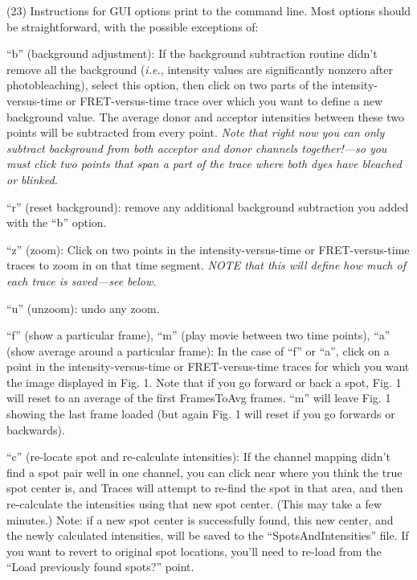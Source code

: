 \documentclass[11pt]{article}
\begin{document}
\noindent (23) Instructions for GUI options print to the command line. Most options should be straightforward, with the possible exceptions of:

``b'' (background adjustment): If the background subtraction routine didn't remove all the background ({\it i.e.}, intensity values are significantly nonzero after photobleaching), select this option, then click on two parts of the intensity-versus-time or FRET-versus-time trace over which you want to define a new background value. The average donor and acceptor intensities between these two points will be subtracted from every point.  {\it Note that right now you can only subtract background from both acceptor and donor channels together!---so you must click two points that span a part of the trace where both dyes have bleached or blinked.}

``r'' (reset background): remove any additional background subtraction you added with the ``b'' option.

``z'' (zoom): Click on two points in the intensity-versus-time or FRET-versus-time traces to zoom in on that time segment. {\it NOTE that this will define how much of each trace is saved---see below.}

``u'' (unzoom): undo any zoom. 

``f'' (show a particular frame), ``m'' (play movie between two time points), ``a'' (show average around a particular frame): In the case of ``f'' or ``a'', click on a point in the intensity-versus-time or FRET-versus-time traces for which you want the image displayed in Fig. 1.  Note that if you go forward or back a spot, Fig. 1 will reset to an average of the first FramesToAvg frames.  ``m'' will leave Fig. 1 showing the last frame loaded (but again Fig. 1 will reset if you go forwards or backwards).

``c'' (re-locate spot and re-calculate intensities): If the channel mapping didn't find a spot pair well in one channel, you can click near where you think the true spot center is, and Traces will attempt to re-find the spot in that area, and then re-calculate the intensities using that new spot center. (This may take a few minutes.)  Note: if a new spot center is successfully found, this new center, and the newly calculated intensities, will be saved to the ``SpotsAndIntensities'' file.  If you want to revert to original spot locations, you'll need to re-load from the ``Load previously found spots?'' point. 
\end{document}
